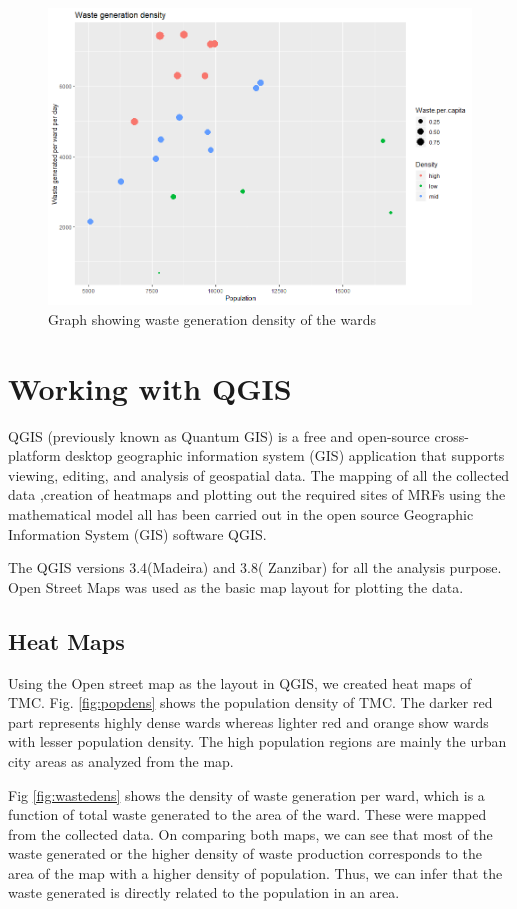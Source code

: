 \documentclass[12pt,a4paper]{  report}
\begin{document}
\begin{figure}
	\centering
	\includegraphics[width=0.7\linewidth]{waste_gen_dens}
	\caption{Graph showing waste generation density of the wards}
	\label{fig:wastegendens}
\end{figure}

\section{Working with QGIS}
QGIS (previously known as Quantum GIS) is a free and open-source cross-platform desktop geographic information system (GIS) application that supports viewing, editing, and analysis of geospatial data.
The mapping of all the collected data ,creation of heatmaps and plotting out the required sites of MRFs using the mathematical model all has been carried out in the open source Geographic Information System (GIS)  software QGIS.


The QGIS versions 3.4(Madeira) and 3.8( Zanzibar) for all the analysis purpose.
Open Street Maps was used as the basic map layout for plotting the data.


 
\subsection{Heat Maps}
Using the Open street map as the layout in QGIS, we created heat maps of TMC. Fig. \ref{fig:popdens} shows the population density of TMC. The darker red part represents highly dense wards whereas lighter red and orange show wards with lesser population density. The high population regions are mainly the urban city areas as analyzed from the map. 

Fig \ref{fig:wastedens} shows the density of waste generation per ward, which is a function of total waste generated to the area of the ward. These were mapped from the collected data. On comparing both maps, we can see that most of the waste generated or the higher density of waste production corresponds to the area of the map with a higher density of population. Thus, we can infer that the waste generated is directly related to the population in an area.
\end{document}
